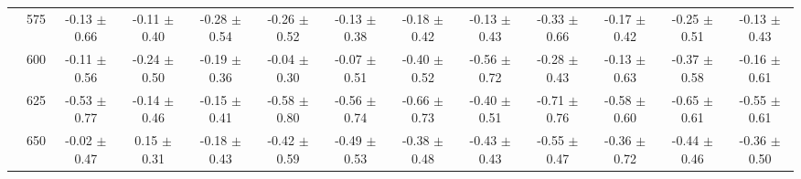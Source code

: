 \begin{table}[h]
{\begin{tabular}{
        ccccccccccccc}
 & 575& -0.13 $\pm$ 0.66& -0.11 $\pm$ 0.40& -0.28 $\pm$ 0.54& -0.26 $\pm$ 0.52& -0.13 $\pm$ 0.38& -0.18 $\pm$ 0.42& -0.13 $\pm$ 0.43& -0.33 $\pm$ 0.66& -0.17 $\pm$ 0.42& -0.25 $\pm$ 0.51& -0.13 $\pm$ 0.43 \\ 
 & 600& -0.11 $\pm$ 0.56& -0.24 $\pm$ 0.50& -0.19 $\pm$ 0.36& -0.04 $\pm$ 0.30& -0.07 $\pm$ 0.51& -0.40 $\pm$ 0.52& -0.56 $\pm$ 0.72& -0.28 $\pm$ 0.43& -0.13 $\pm$ 0.63& -0.37 $\pm$ 0.58& -0.16 $\pm$ 0.61 \\ 
 & 625& -0.53 $\pm$ 0.77& -0.14 $\pm$ 0.46& -0.15 $\pm$ 0.41& -0.58 $\pm$ 0.80& -0.56 $\pm$ 0.74& -0.66 $\pm$ 0.73& -0.40 $\pm$ 0.51& -0.71 $\pm$ 0.76& -0.58 $\pm$ 0.60& -0.65 $\pm$ 0.61& -0.55 $\pm$ 0.61 \\ 
 & 650& -0.02 $\pm$ 0.47& 0.15 $\pm$ 0.31& -0.18 $\pm$ 0.43& -0.42 $\pm$ 0.59& -0.49 $\pm$ 0.53& -0.38 $\pm$ 0.48& -0.43 $\pm$ 0.43& -0.55 $\pm$ 0.47& -0.36 $\pm$ 0.72& -0.44 $\pm$ 0.46& -0.36 $\pm$ 0.50 \\ \hline 

        \end{tabular}%
        }

        \end{table}
        
